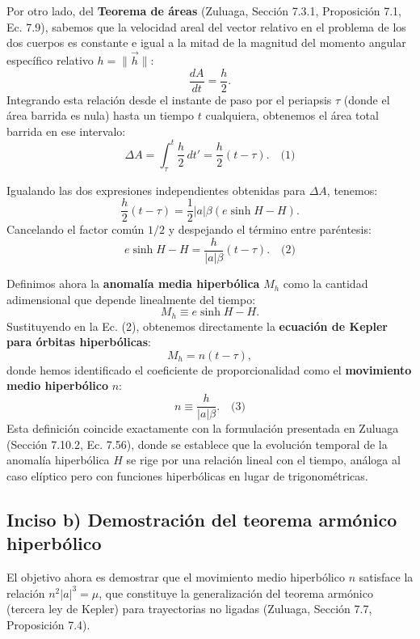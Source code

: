 \documentclass[12pt, a4paper]{article}
\begin{document}
Por otro lado, del \textbf{Teorema de áreas} (Zuluaga, Sección 7.3.1, Proposición 7.1, Ec. 7.9), sabemos que la velocidad areal del vector relativo en el problema de los dos cuerpos es constante e igual a la mitad de la magnitud del momento angular específico relativo $h = \|\vec{h}\|$:
$$
\frac{dA}{dt} = \frac{h}{2}.
$$
Integrando esta relación desde el instante de paso por el periapsis $\tau$ (donde el área barrida es nula) hasta un tiempo $t$ cualquiera, obtenemos el área total barrida en ese intervalo:
$$
\Delta A = \int_{\tau}^{t} \frac{h}{2} \, dt' = \frac{h}{2} (t - \tau). \quad \text{(1)}
$$

Igualando las dos expresiones independientes obtenidas para $\Delta A$, tenemos:
$$
\frac{h}{2} (t - \tau) = \frac{1}{2} |a| \beta \left( e \sinh H - H \right).
$$
Cancelando el factor común $1/2$ y despejando el término entre paréntesis:
$$
e \sinh H - H = \frac{h}{|a| \beta} (t - \tau). \quad \text{(2)}
$$

Definimos ahora la \textbf{anomalía media hiperbólica} $M_h$ como la cantidad adimensional que depende linealmente del tiempo:
$$
M_h \equiv e \sinh H - H.
$$
Sustituyendo en la Ec. (2), obtenemos directamente la \textbf{ecuación de Kepler para órbitas hiperbólicas}:
$$
M_h = n (t - \tau),
$$
donde hemos identificado el coeficiente de proporcionalidad como el \textbf{movimiento medio hiperbólico} $n$:
$$
n \equiv \frac{h}{|a| \beta}. \quad \text{(3)}
$$
Esta definición coincide exactamente con la formulación presentada en Zuluaga (Sección 7.10.2, Ec. 7.56), donde se establece que la evolución temporal de la anomalía hiperbólica $H$ se rige por una relación lineal con el tiempo, análoga al caso elíptico pero con funciones hiperbólicas en lugar de trigonométricas.

\subsection*{Inciso b) Demostración del teorema armónico hiperbólico}
El objetivo ahora es demostrar que el movimiento medio hiperbólico $n$ satisface la relación $n^2 |a|^3 = \mu$, que constituye la generalización del teorema armónico (tercera ley de Kepler) para trayectorias no ligadas (Zuluaga, Sección 7.7, Proposición 7.4).
\end{document}
